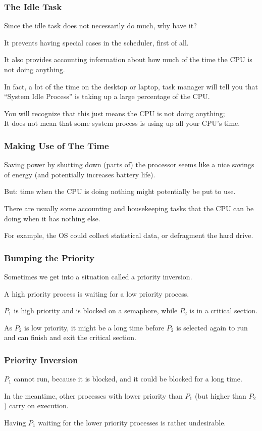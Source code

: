 \begin{frame}
\frametitle{The Idle Task}

Since the idle task does not necessarily do much, why have it? 

It prevents having special cases in the scheduler, first of all. 

It also provides accounting information about how much of the time the CPU is not doing anything. 

In fact, a lot of the time on the desktop or laptop, task manager will tell you that ``System Idle Process'' is taking up a large percentage of the CPU. 

You will recognize that this just means the CPU is not doing anything;\\
\quad It does not mean that some system process is using up all your CPU's time.


\end{frame}

\begin{frame}
\frametitle{Making Use of The Time}

Saving power by shutting down (parts of) the processor seems like a nice savings of energy (and potentially increases battery life). 

But: time when the CPU is doing nothing might potentially be put to use.

There are usually some accounting and housekeeping tasks that the CPU can be doing when it has nothing else. 
 
For example, the OS could collect statistical data, or defragment the hard drive.


\end{frame}

\begin{frame}
\frametitle{Bumping the Priority}

Sometimes we get into a situation called a \alert{priority inversion}. 

A high priority process is waiting for a low priority process. 

$P_{1}$ is high priority and is blocked on a semaphore, while $P_{2}$ is in a critical section. 

As $P_{2}$ is low priority, it might be a long time before $P_{2}$ is selected again to run and can finish and exit the critical section. 

\end{frame}

\begin{frame}
\frametitle{Priority Inversion}

$P_{1}$ cannot run, because it is blocked, and it could be blocked for a long time. 

In the meantime, other processes with lower priority than $P_{1}$ (but higher than $P_{2}$) carry on execution. 

Having $P_{1}$ waiting for the lower priority processes is rather undesirable.


\end{frame}

